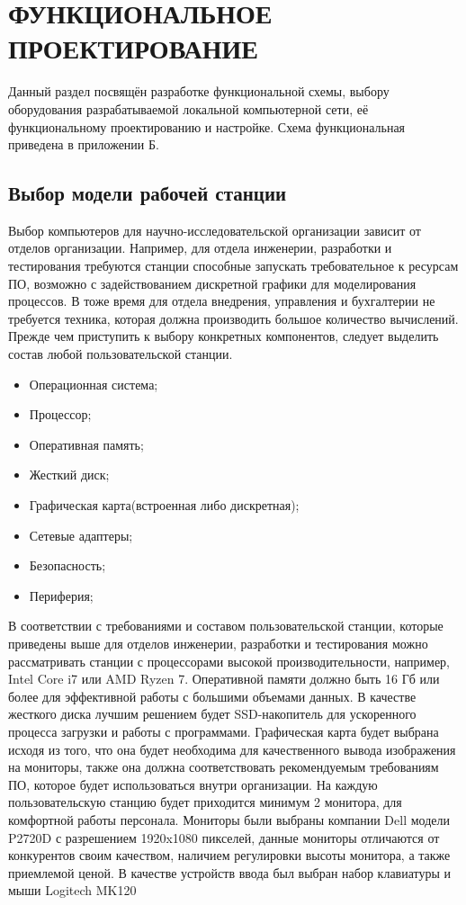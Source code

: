 \section{ФУНКЦИОНАЛЬНОЕ ПРОЕКТИРОВАНИЕ}
\label{sec:func}

Данный раздел посвящён разработке функциональной схемы, выбору оборудования 
разрабатываемой локальной компьютерной сети, её функциональному проектированию и настройке. 
Схема функциональная приведена в приложении Б. 

\subsection{Выбор модели рабочей станции}

Выбор компьютеров для научно-исследовательской организации зависит от отделов организации. 
Например, для отдела инженерии, разработки и тестирования требуются станции способные запускать требовательное к ресурсам ПО, 
возможно с задействованием дискретной графики для моделирования процессов. 
В тоже время для отдела внедрения, управления и бухгалтерии не требуется техника, которая должна производить большое количество вычислений.
Прежде чем приступить к выбору конкретных компонентов, следует выделить состав любой пользовательской станции.

\begin{itemize}
    \item Операционная система;
    \item Процессор;
    \item Оперативная память;
    \item Жесткий диск;
    \item Графическая карта(встроенная либо дискретная);
    \item Сетевые адаптеры;
    \item Безопасность;
    \item Периферия;
\end{itemize}

В соответствии с требованиями и составом пользовательской станции, которые приведены выше для отделов инженерии, разработки и тестирования
можно рассматривать станции с процессорами высокой производительности, например, Intel Core i7 или AMD Ryzen 7. Оперативной памяти должно быть 16 Гб 
или более для эффективной работы с большими объемами данных. В качестве жесткого диска лучшим решением будет SSD-накопитель для ускоренного процесса 
загрузки и работы с программами. Графическая карта будет выбрана исходя из того, что она будет необходима для качественного вывода изображения на мониторы,
также она должна соответствовать рекомендуемым требованиям ПО, которое будет использоваться внутри организации. На каждую пользовательскую станцию будет приходится
минимум 2 монитора, для комфортной работы персонала. Мониторы были выбраны компании Dell модели P2720D с разрешением 1920x1080 пикселей, данные мониторы отличаются от конкурентов своим качеством,
наличием регулировки высоты монитора, а также приемлемой ценой. В качестве устройств ввода был выбран набор клавиатуры и мыши Logitech MK120

